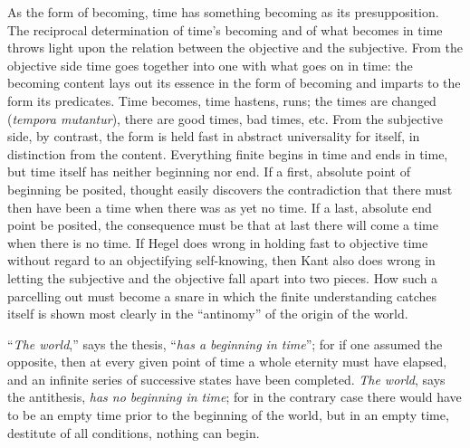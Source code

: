 \documentclass[12pt,a4paper]{book}
\begin{document}
As the form of becoming, time has something becoming as its presupposition. The
reciprocal determination of time's becoming and of what becomes in time throws
light upon the relation between the objective and the subjective. From the
objective side time goes together into one with what goes on in time: the
becoming content lays out its essence in the form of becoming and imparts to the
form
its predicates. Time becomes, time hastens, runs; the times are changed (\textit{tempora
mutantur}), there are good times, bad times, etc. From the subjective side, by
contrast, the form is held fast in abstract universality for itself, in
distinction from the content. Everything finite begins in time and ends in time,
but time itself has neither beginning nor end. If a first, absolute point of
beginning be posited, thought easily discovers the contradiction that there must
then have been a time when there was as yet no time. If a last, absolute end
point be posited, the consequence must be that at last there will come a time
when there is no time. If Hegel does wrong in holding fast to objective time
without regard to an objectifying self-knowing, then Kant also does wrong in
letting the subjective and the objective fall apart into two pieces. How such a
parcelling out must become a snare in which the finite understanding catches
itself is shown most clearly in the ``antinomy'' of the origin of the world.

``\emph{The world},'' says the thesis, ``\emph{has a beginning in time}''; for if
one assumed the opposite, then at every given point of time a whole eternity must
have elapsed, and an infinite series of successive states have been completed.
\emph{The world}, says the antithesis, \emph{has no beginning in time}; for in the
contrary case there would have to be an empty time prior to the beginning of the
world, but in an empty time, destitute of all conditions, nothing can begin.
\end{document}
